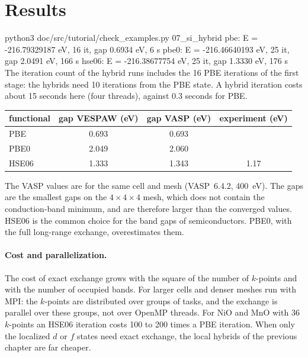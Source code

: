 \documentclass[11pt,a4paper,oneside]{book}
\newenvironment{shell}{\small\verbatim}{\endverbatim}
\begin{document}
\section{Results}

\begin{shell}
python3 doc/src/tutorial/check_examples.py 07_si_hybrid
    pbe: E = -216.79329187 eV, 16 it, gap 0.6934 eV, 6 s
    pbe0: E = -216.46640193 eV, 25 it, gap 2.0491 eV, 166 s
    hse06: E = -216.38677754 eV, 25 it, gap 1.3330 eV, 176 s
\end{shell}
The iteration count of the hybrid runs includes the 16 PBE iterations of
the first stage: the hybrids need 10 iterations from the PBE state. A
hybrid iteration costs about 15 seconds here (four threads), against 0.3 seconds for PBE.
\begin{center}
\begin{tabular}{lccc}\toprule
functional & gap VESPAW (eV) & gap VASP (eV) & experiment (eV) \\ \midrule
PBE   & 0.693 & 0.693 & \\
PBE0  & 2.049 & 2.060 & \\
HSE06 & 1.333 & 1.343 & 1.17 \\ \bottomrule
\end{tabular}
\end{center}
The VASP values are for the same cell and mesh (VASP~6.4.2, 400~eV). The
gaps are the smallest gaps on the $4\times4\times4$ mesh, which does not
contain the conduction-band minimum, and are therefore larger than the
converged values. HSE06 is the common choice for the band gaps of
semiconductors. PBE0, with the full long-range exchange, overestimates
them.

\paragraph{Cost and parallelization.} The cost of exact exchange grows
with the square of the number of $k$-points and with the number of
occupied bands. For larger cells and denser meshes run with MPI: the
$k$-points are distributed over groups of tasks, and the exchange is
parallel over these groups, not over OpenMP threads. For NiO and MnO
with 36 $k$-points an HSE06 iteration costs 100 to 200 times a PBE
iteration. When only the localized $d$ or $f$ states need exact
exchange, the local hybrids of the previous chapter are far cheaper.
\end{document}
